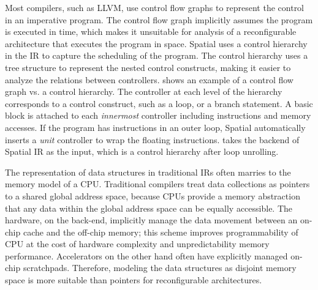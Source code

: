 Most compilers, such as LLVM, use control flow graphs to represent the control in an imperative program.
The control flow graph implicitly assumes the program is executed in time, which makes it unsuitable
for analysis of a reconfigurable architecture that executes the program in space. 
Spatial uses a control hierarchy in the IR to capture the scheduling of the program.
The control hierarchy uses a tree structure to represent the nested control constructs, making it
easier to analyze the relations between controllers.
 shows an example of a control flow graph vs. a control hierarchy.
The controller at each level of the hierarchy corresponds to a control construct, such as a loop, or
a branch statement. 
A basic block is attached to each \emph{innermost} controller including instructions
and memory accesses.
If the program has instructions in an outer loop, Spatial automatically inserts a \emph{unit}
controller to wrap the floating instructions.
\name takes the backend of Spatial IR as the input, which is a control hierarchy after loop
unrolling.


The representation of data structures in traditional IRs often marries to the memory model of a 
CPU. Traditional compilers treat data collections as pointers to a shared
global address space, because
CPUs provide a memory abstraction that any data within the global address space 
can be equally accessible.
The hardware, on the back-end, implicitly manage the data movement between an on-chip cache and the off-chip 
memory; this scheme improves programmability of CPU at the cost of hardware complexity and unpredictability memory
performance.
Accelerators on the other hand often have explicitly managed on-chip scratchpads.
Therefore, modeling the data structures as disjoint memory space is more suitable than pointers for reconfigurable architectures.

